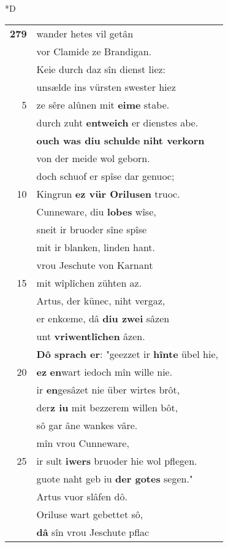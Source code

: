 \documentclass[8pt,a4paper,notitlepage]{article}
\begin{document}
\begin{table}[ht]
\begin{minipage}[t]{0.5\linewidth}
\small
\begin{center}*D
\end{center}
\begin{tabular}{rl}
\textbf{279} & wander hetes vil getân\\ 
 & vor Clamide ze Brandigan.\\ 
 & Keie durch daz sîn dienst liez:\\ 
 & unsælde ins vürsten swester hiez\\ 
5 & ze sêre alûnen mit \textbf{eime} stabe.\\ 
 & durch zuht \textbf{entweich} er dienstes abe.\\ 
 & \textbf{ouch was diu schulde} \textbf{niht verkorn}\\ 
 & von der meide wol geborn.\\ 
 & doch schuof er spîse dar genuoc;\\ 
10 & Kingrun \textbf{ez vür Orilusen} truoc.\\ 
 & Cunneware, diu \textbf{lobes} wîse,\\ 
 & sneit ir bruoder sîne spîse\\ 
 & mit ir blanken, linden hant.\\ 
 & vrou Jeschute von Karnant\\ 
15 & mit wîplîchen zühten az.\\ 
 & Artus, der künec, niht vergaz,\\ 
 & er enkœme, dâ \textbf{diu zwei} sâzen\\ 
 & unt \textbf{vriwentlîchen} âzen.\\ 
 & \textbf{Dô sprach er}: "geezzet ir \textbf{hînte} übel hie,\\ 
20 & \textbf{ez} \textbf{en}wart iedoch mîn wille nie.\\ 
 & ir \textbf{en}gesâzet nie über wirtes brôt,\\ 
 & der\textbf{z iu} mit bezzerem willen bôt,\\ 
 & sô gar âne wankes vâre.\\ 
 & mîn vrou Cunneware,\\ 
25 & ir sult \textbf{iwers} bruoder hie wol pflegen.\\ 
 & guote naht geb iu \textbf{der gotes} segen."\\ 
 & Artus vuor slâfen dô.\\ 
 & Oriluse wart gebettet sô,\\ 
 & \textbf{dâ} sîn vrou Jeschute pflac\\ 

\end{tabular}
\end{minipage}
\end{table}
\end{document}
